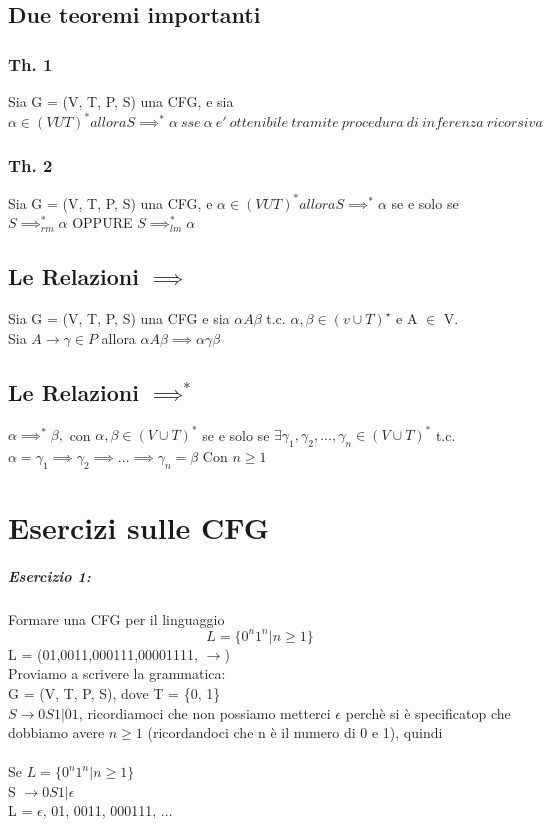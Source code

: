\documentclass[12pt, a4paper, openany, oneside]{book}
\begin{document}
\section{Due teoremi importanti}
\subsection{Th. 1}
Sia G = (V, T, P, S) una CFG, e sia $\alpha \in (VUT)^{*} allora 
S \implies ^{*}\alpha ~sse~ \alpha ~ e' ~ ottenibile ~ tramite ~ procedura ~ di  ~
inferenza ~ ricorsiva$
\subsection{Th. 2}
Sia G = (V, T, P, S) una CFG, e $\alpha \in (VUT)^{*} allora S \implies ^{*} \alpha$
se e solo se $S \implies_{rm}^{*} \alpha$ OPPURE $S \implies _{lm} ^{*} \alpha$
\section{Le Relazioni $\implies$}
Sia G = (V, T, P, S) una CFG e sia $\alpha A \beta$ t.c. $\alpha , \beta \in
 (v\cup T)^{\star}$ e A $\in$ V. \\
 Sia $A \to \gamma \in P$ allora $\alpha A \beta \implies \alpha \gamma \beta$
\section{Le Relazioni $\implies^{*}$}
$\alpha \implies^{*} \beta ,$ con $\alpha, \beta \in (V \cup T)^{*}$ se e solo se
$\exists \gamma_{1}, \gamma_{2}, ... , \gamma_{n} \in (V \cup T)^{*}$ t.c.
$\alpha = \gamma_{1} \implies \gamma_{2} \implies ... \implies \gamma_{n} = \beta$
Con $n \geq 1$
\chapter{Esercizi sulle CFG}
\paragraph{Esercizio 1: }Formare una CFG per il linguaggio \\
$$L = \{0^{n} 1^{n} | n \geq 1 \}$$
L = (01,0011,000111,00001111, $\to$)
\\ Proviamo a scrivere la grammatica: \\
G = (V, T, P, S), dove T = \{0, 1\} \\
$S \to 0S1 | 01$, ricordiamoci che non possiamo metterci $\epsilon$ perchè si è
specificatop che dobbiamo avere $n \geq 1$ (ricordandoci che n è il 
numero di 0 e 1), quindi 
\\ \\
Se $L = \{0^{n} 1^{n} | n \geq 1 \}$ \\
S $\to 0S1 | \epsilon$ \\
L = {$\epsilon$, 01, 0011, 000111, ...}
\end{document}
